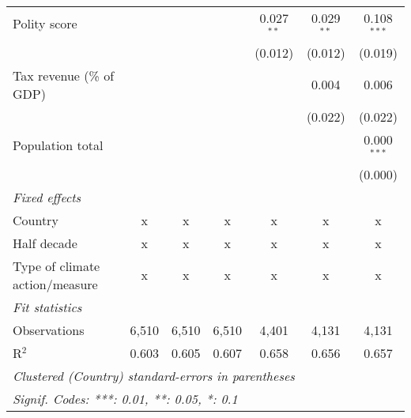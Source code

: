 \begin{tabular}{lcccccc}
   Polity score                                                 &             &                &                & 0.027$^{**}$   & 0.029$^{**}$   & 0.108$^{***}$\\   
                                                                &             &                &                & (0.012)        & (0.012)        & (0.019)\\   
   Tax revenue (\% of GDP)                                      &             &                &                &                & 0.004          & 0.006\\   
                                                                &             &                &                &                & (0.022)        & (0.022)\\   
   Population total                                             &             &                &                &                &                & 0.000$^{***}$\\   
                                                                &             &                &                &                &                & (0.000)\\   
   \emph{Fixed effects}\\
   Country                                                      & x           & x              & x              & x              & x              & x\\  
   Half decade                                                  & x           & x              & x              & x              & x              & x\\  
   Type of climate action/measure                               & x           & x              & x              & x              & x              & x\\  
   \midrule \emph{Fit statistics}\\
   Observations                                                 & 6,510       & 6,510          & 6,510          & 4,401          & 4,131          & 4,131\\  
   R$^2$                                                        & 0.603       & 0.605          & 0.607          & 0.658          & 0.656          & 0.657\\  
   \midrule
   \multicolumn{7}{l}{\emph{Clustered (Country) standard-errors in parentheses}}\\
   \multicolumn{7}{l}{\emph{Signif. Codes: ***: 0.01, **: 0.05, *: 0.1}}\\
\end{tabular}
\par\endgroup


